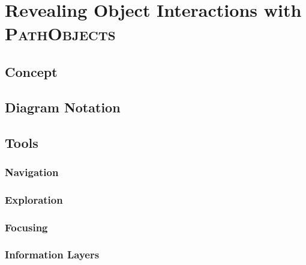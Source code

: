 \chapter{Revealing Object Interactions with \textsc{PathObjects}}
\label{c:approach}

\section{Concept}

\section{Diagram Notation}

\section{Tools}
\subsection{Navigation}
\subsection{Exploration}
\subsection{Focusing}
\subsection{Information Layers}